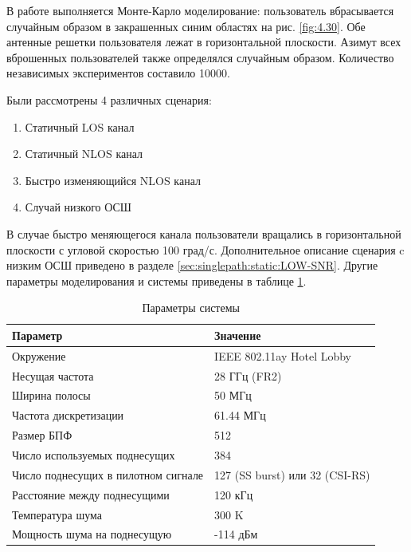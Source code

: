 В работе выполняется  Монте-Карло моделирование: пользователь вбрасывается
случайным образом в закрашенных синим областях на рис. \ref{fig:4.30}.
Обе антенные решетки пользователя лежат в горизонтальной плоскости.
Азимут всех вброшенных пользователей также определялся случайным образом.
Количество независимых экспериментов составило 10000.

Были рассмотрены 4 различных сценария:
\begin{enumerate}
  \item Статичный LOS канал
  \item Статичный NLOS канал
  \item Быстро изменяющийся NLOS канал
  \item Случай низкого ОСШ
\end{enumerate}

В случае быстро меняющегося канала пользователи вращались в горизонтальной
плоскости с угловой скоростью 100 град/с. Дополнительное описание
сценария c низким ОСШ приведено в разделе \ref{sec:singlepath:static:LOW-SNR}.
Другие параметры моделирования и системы приведены в таблице \ref{tab:4.10}.

\begin{table}
  \centering
  \caption{Параметры системы}
  \label{tab:4.10}
  \begin{tabular}{ll}
    \toprule
    \textbf{Параметр}                   & \textbf{Значение}              \\
    \midrule
    Окружение                           & IEEE 802.11ay Hotel Lobby      \\
    Несущая частота                     & 28 ГГц (FR2)                   \\
    Ширина полосы                       & 50 МГц                         \\
    Частота дискретизации               & 61.44 МГц                      \\
    Размер БПФ                          & 512                            \\
    Число используемых поднесущих       & 384                            \\
    Число поднесущих в пилотном сигнале & 127 (SS burst) или 32 (CSI-RS) \\
    Расстояние между поднесущими        & 120 кГц                        \\
    Температура шума                    & 300 K                          \\
    Мощность шума на поднесущую         & -114 дБм                       \\
    \bottomrule
  \end{tabular}
\end{table}

